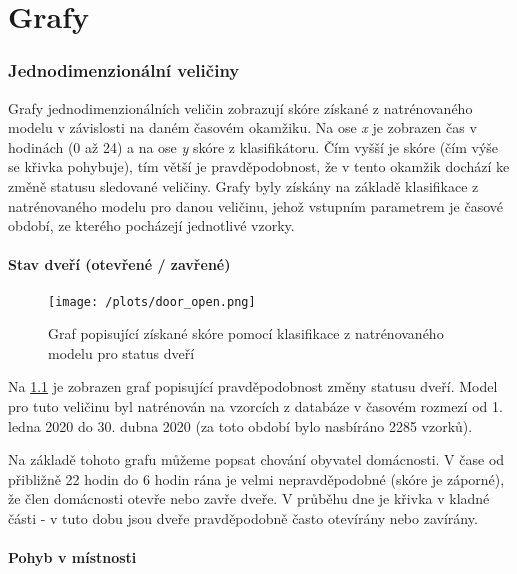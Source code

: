 \chapter{Grafy} \label{app:diagnostics}
\vspace*{-10mm}

\subsection*{Jednodimenzionální veličiny} \label{app_diagnostics_1D}

Grafy jednodimenzionálních veličin zobrazují skóre získané z natrénovaného modelu v závislosti na daném časovém okamžiku. Na ose \textit{x} je zobrazen čas v hodinách (0 až 24) a na ose \textit{y} skóre z klasifikátoru. Čím vyšší je skóre (čím výše se křivka pohybuje), tím větší je pravděpodobnost, že v tento okamžik dochází ke změně statusu sledované veličiny. Grafy byly získány na základě klasifikace z natrénovaného modelu pro danou veličinu, jehož vstupním parametrem je časové období, ze kterého pocházejí jednotlivé vzorky. 

\subsubsection*{Stav dveří (otevřené / zavřené)}

\begin{figure}[H]
  \centering
  \texttt{[image: /plots/door\_open.png]}
  \caption{Graf popisující získané skóre pomocí klasifikace z natrénovaného modelu pro status dveří}
  \label{fig:app_door_open}
\end{figure}

Na \cref{fig:app_door_open} je zobrazen graf popisující pravděpodobnost změny statusu dveří. Model pro tuto veličinu byl natrénován na vzorcích z databáze v časovém rozmezí od 1. ledna 2020 do 30. dubna 2020 (za toto období bylo nasbíráno 2285 vzorků). \par
Na základě tohoto grafu můžeme popsat chování obyvatel domácnosti. V čase od přibližně 22 hodin do 6 hodin rána je velmi nepravděpodobné (skóre je záporné), že člen domácnosti otevře nebo zavře dveře. V průběhu dne je křivka v kladné části - v tuto dobu jsou dveře pravděpodobně často otevírány nebo zavírány. 

\subsubsection*{Pohyb v místnosti}

